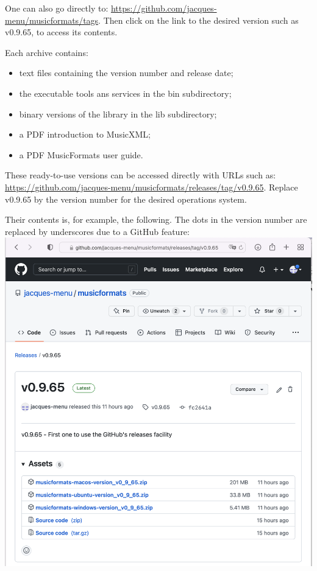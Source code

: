 One can also go directly to:
\url{https://github.com/jacques-menu/musicformats/tags}.
Then click on the link to the desired version such as v0.9.65, to access its contents.

Each  archive contains:
\begin{itemize}
\item  text files containing the version number and release date;
\item  the executable tools ans services in the bin subdirectory;
\item  binary versions of the library in the lib subdirectory;
\item  a PDF introduction to MusicXML;
\item  a PDF MusicFormats user guide.
\end{itemize}

These ready-to-use versions can be accessed directly with URLs such as:
\url{https://github.com/jacques-menu/musicformats/releases/tag/v0.9.65}.
Replace v0.9.65 by the version number for the desired operations system.

Their contents is, for example, the following. The dots in the version number are replaced by underscores due to a GitHub feature:\\
\includegraphics[scale=0.5]{../mfgraphics/mfgraphicsReadyToUseVersionContents.png}

